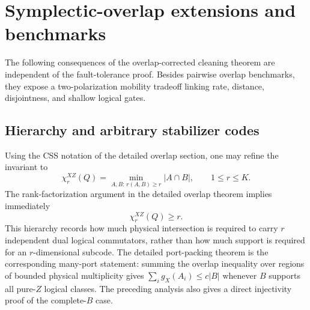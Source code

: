 \documentclass[aps,prx,reprint,superscriptaddress,nofootinbib,floatfix,longbibliography]{revtex4-2}
\theoremstyle{definition}
\begin{document}
\section{Symplectic-overlap extensions and benchmarks}
\label{sec:supp-overlap}
The following consequences of the overlap-corrected cleaning theorem are independent of the fault-tolerance proof.  Besides pairwise overlap benchmarks, they expose a two-polarization mobility tradeoff linking rate, distance, disjointness, and shallow logical gates.

\subsection{Hierarchy and arbitrary stabilizer codes}
Using the CSS notation of the detailed overlap section, one may refine the invariant to
\begin{equation}
 \chi_r^{XZ}(Q)=\min_{A,B:\,r(A,B)\ge r}|A\cap B|,
 \qquad 1\le r\le K. \tag{S12}
\end{equation}
The rank-factorization argument in the detailed overlap theorem implies immediately
\begin{equation}
 \chi_r^{XZ}(Q)\ge r. \tag{S13}
\end{equation}
This hierarchy records how much physical intersection is required to carry
$r$ independent dual logical commutators, rather than how much support is
required for an $r$-dimensional subcode.
The detailed port-packing theorem is the corresponding many-port statement: summing the overlap inequality over regions of bounded physical multiplicity gives $\sum_i g_X(A_i)\le c|B|$ whenever $B$ supports all pure-$Z$ logical classes.  The preceding analysis also gives a direct injectivity proof of the complete-$B$ case.
\end{document}
